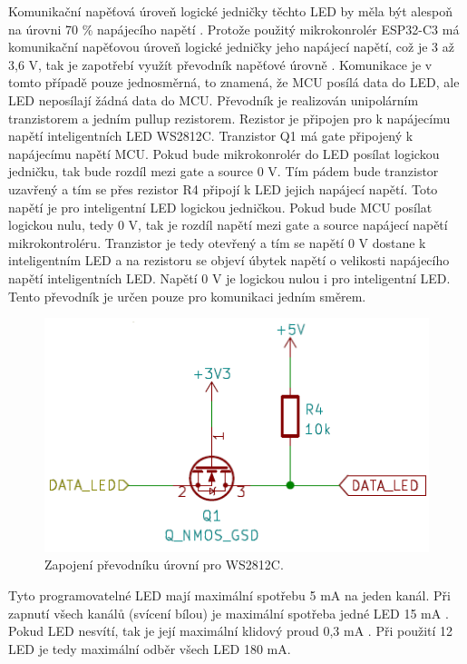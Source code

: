 Komunikační napěťová úroveň logické jedničky těchto LED by měla být alespoň na úrovni 70 \% napájecího napětí \cite{WS2812C_dtsh}. 
Protože použitý mikrokonrolér ESP32-C3 má komunikační napěťovou úroveň logické jedničky jeho napájecí napětí, což je 3 až 3,6 V, 
tak je zapotřebí využít převodník napěťové úrovně \cite{ESP_C3_dtsh}. Komunikace je v tomto případě pouze jednosměrná, 
to znamená, že MCU posílá data do LED, ale LED neposílají žádná data do MCU. Převodník je realizován unipolárním tranzistorem 
a jedním pullup rezistorem. Rezistor je připojen pro k napájecímu napětí inteligentních LED WS2812C. 
Tranzistor Q1 má gate připojený k napájecímu napětí MCU. Pokud bude mikrokonrolér do LED posílat logickou jedničku, tak bude rozdíl
mezi gate a source 0 V. Tím pádem bude tranzistor uzavřený a tím se přes rezistor R4 připojí k LED jejich napájecí napětí. Toto napětí 
je pro inteligentní LED logickou jedničkou. Pokud bude MCU posílat logickou nulu, tedy 0 V, tak je rozdíl napětí mezi gate a source 
napájecí napětí mikrokontroléru. Tranzistor je tedy otevřený a tím se napětí 0 V dostane k inteligentním LED a na rezistoru se objeví
úbytek napětí o velikosti napájecího napětí inteligentních LED. Napětí 0 V je logickou nulou i pro inteligentní LED. Tento převodník
je určen pouze pro komunikaci jedním směrem. 

\begin{figure}[!h]
  \begin{center}
    \includegraphics[scale=0.6]{obrazky/prevodnik_urovni_pro_WS2812C.png}
  \end{center}
  \caption[Zapojení převodníku úrovní pro WS2812C]{Zapojení převodníku úrovní pro WS2812C.}
\end{figure} 

Tyto programovatelné LED mají maximální spotřebu 5 mA na jeden kanál. Při zapnutí všech kanálů (svícení bílou) je maximální
spotřeba jedné LED 15 mA \cite{WS2812C_dtsh}. Pokud LED nesvítí, tak je její maximální klidový proud 0,3 mA \cite{WS2812C_dtsh}.
Při použití 12 LED je tedy maximální odběr všech LED 180 mA.

